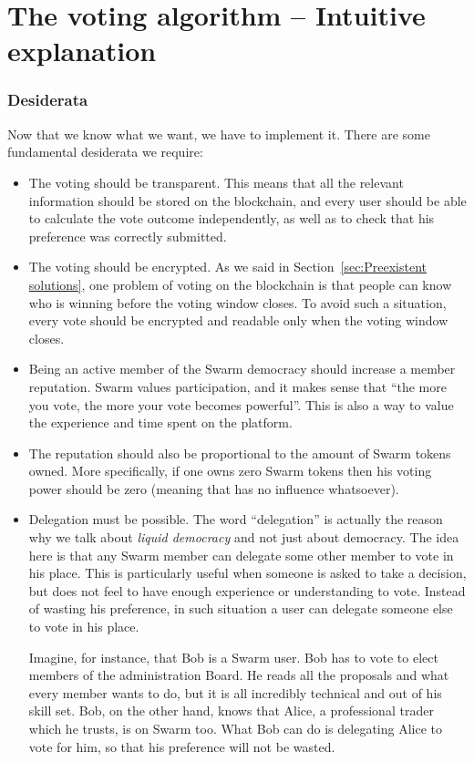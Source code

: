 \documentclass[submission, copyright,creativecommons,sharealike,noncommercial]{eptcs}
\begin{document}
\section{The voting algorithm -- Intuitive explanation}\label{sec:Voting intuitive}
%
\subsubsection{Desiderata}\label{subsubsec:Desiderata}
	Now that we know what we want, we have to implement it. There are some fundamental desiderata we require:
	\begin{itemize}
		\item The voting should be transparent. This means that all the relevant information should be stored on the blockchain, and every user should be able to calculate the vote outcome independently, as well as to check that his preference was correctly submitted.
		\item The voting should be encrypted. As we said in Section~\ref{sec:Preexistent solutions}, one problem of voting on the blockchain is that people can know who is winning before the voting window closes. To avoid such a situation, every vote should be encrypted and readable only when the voting window closes.
		\item Being an active member of the Swarm democracy should increase a member reputation. Swarm values participation, and it makes sense that ``the more you vote, the more your vote becomes powerful''. This is also a way to value the experience and time spent on the platform.
		\item The reputation should also be proportional to the amount of Swarm tokens owned. More specifically, if one owns zero Swarm tokens then his voting power should be zero (meaning that has no influence whatsoever).
		\item Delegation must be possible. The word ``delegation'' is actually the reason why we talk about \emph{liquid democracy} and not just about democracy. The idea here is that any Swarm member can delegate some other member to vote in his place. This is particularly useful when someone is asked to take a decision, but does not feel to have enough experience or understanding to vote. Instead of wasting his preference, in such situation a user can delegate someone else to vote in his place.
		
		Imagine, for instance, that Bob is a Swarm user. Bob has to vote to elect members of the administration Board. He reads all the proposals and what every member wants to do, but it is all incredibly technical and out of his skill set. Bob, on the other hand, knows that Alice, a professional trader which he trusts, is on Swarm too. What Bob can do is delegating Alice to vote for him, so that his preference will not be wasted.		
	\end{itemize}
%
%
\end{document}
